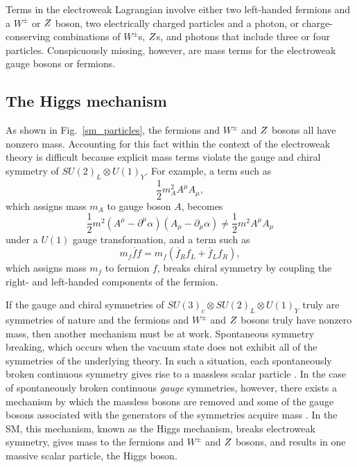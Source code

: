 Terms in the electroweak Lagrangian involve either two left-handed fermions and a $W^{\pm}$ or $Z$ boson, two electrically charged particles and a photon, or charge-conserving combinations of $W^{\pm}$s, $Z$s, and photons that include three or four particles.  Conspicuously missing, however, are mass terms for the electroweak gauge bosons or fermions.

\subsection{The Higgs mechanism}
As shown in Fig.~\ref{sm_particles}, the fermions and $W^{\pm}$ and $Z$ bosons all have nonzero mass. Accounting for this fact within the context of the electroweak theory is difficult because explicit mass terms violate the gauge and chiral symmetry of $SU(2)_{L} \otimes U(1)_{Y}$. For example, a term such as
\begin{equation}
    \frac{1}{2}m_{A}^{2}A^{\mu}A_{\mu},
\end{equation}
which assigns mass $m_{A}$ to gauge boson $A$, becomes
\begin{equation}
    \frac{1}{2}m^{2}(A^{\mu}-\partial^{\mu}\alpha)(A_{\mu}-\partial_{\mu}\alpha) \neq \frac{1}{2}m^{2}A^{\mu}A_{\mu}
\end{equation}
under a $U(1)$ gauge transformation, and a term such as
\begin{equation}
    m_{f}\overline{f}f = m_{f}(\overline{f}_{R}f_{L} + \overline{f}_{L}f_{R}),
\end{equation}
which assigns mass $m_{f}$ to fermion $f$, breaks chiral symmetry by coupling the right- and left-handed components of the fermion.

If the gauge and chiral symmetries of $SU(3)_{c} \otimes SU(2)_{L} \otimes U(1)_{Y}$ truly are symmetries of nature and the fermions and $W^{\pm}$ and $Z$ bosons truly have nonzero mass, then another mechanism must be at work. Spontaneous symmetry breaking, which occurs when the vacuum state does not exhibit all of the symmetries of the underlying theory. In such a situation, each spontaneously broken continuous symmetry gives rise to a massless scalar particle \cite{goldstone_salam_weinberg}. In the case of spontaneously broken continuous \textit{gauge} symmetries, however, there exists a mechanism by which the massless bosons are removed and some of the gauge bosons associated with the generators of the symmetries acquire mass \cite{englert, higgs, kibble}. In the SM, this mechanism, known as the Higgs mechanism, breaks electroweak symmetry, gives mass to the fermions and $W^{\pm}$ and $Z$ bosons, and results in one massive scalar particle, the Higgs boson.

